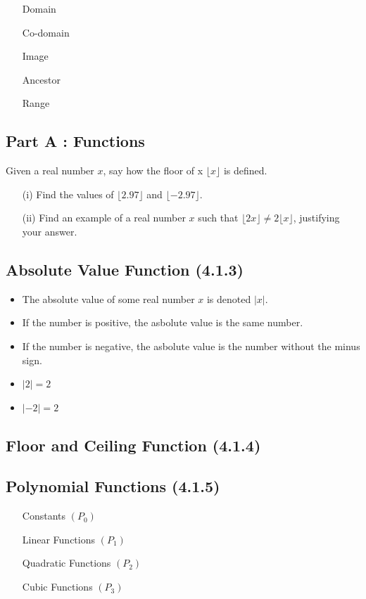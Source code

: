 \documentclass[]{report}
\begin{document}
\begin{enumerate}
\begin{itemize}
\item[Domain]
\item[Co-domain]
\item[Image]
\item[Ancestor]
\item[Range]
\end{itemize}

\subsection*{Part A : Functions}
Given a real number $x$, say how the floor of x  $\lfloor x \rfloor$ is defined.
\begin{itemize}
\item[(i)] Find the values of $\lfloor 2.97 \rfloor$ and $\lfloor -2.97 \rfloor$.
\item[(ii)] Find an example of a real number $x$ such that $\lfloor 2x \rfloor  \neq 2\lfloor x \rfloor$, justifying your answer.
\end{itemize}



\subsection*{Absolute Value Function (4.1.3)}


\begin{itemize}
\item The absolute value of some real number $x$ is denoted $|x|$.
\item If the number is positive, the asbolute value is the same number.
\item If the number is negative, the asbolute value is the number without the minus sign.
\item $|2|=2$
\item $|-2| = 2$
\end{itemize}
\subsection*{Floor and Ceiling Function (4.1.4)}
\subsection*{Polynomial Functions (4.1.5)}

\begin{itemize}
\item[Constants] $(P_0)$
\item[Linear Functions] $(P_1)$
\item[Quadratic Functions] $(P_2)$
\item[Cubic Functions] $(P_3)$
\end{itemize}



\end{enumerate}
\end{document}

